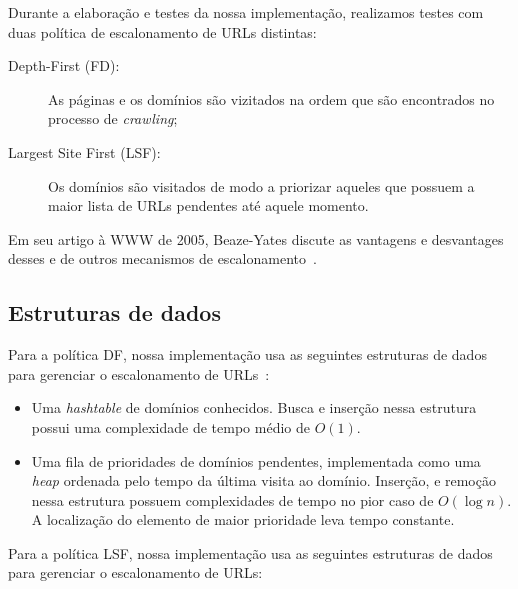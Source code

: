 \documentclass[10pt,twocolumn]{article}
\begin{document}
Durante a elaboração e testes da nossa implementação, realizamos testes
com duas política de escalonamento de URLs distintas:
\begin{description}
\item[Depth-First (FD):] As páginas e os domínios são vizitados na ordem que
são encontrados no processo de \emph{crawling};
\item[Largest Site First (LSF):] Os domínios são visitados de modo a priorizar
aqueles que possuem a maior lista de URLs pendentes até aquele momento.
\end{description}

Em seu artigo à WWW de 2005, Beaze-Yates discute as vantagens e
desvantages desses e de outros mecanismos de
escalonamento~\cite{baezayates2005crawling}.



\subsection{Estruturas de dados}

Para a política DF, nossa implementação usa as seguintes estruturas de
dados para gerenciar o escalonamento de URLs~\cite{cormen-algorithms}:

\begin{itemize}
\item Uma \emph{hashtable} de domínios conhecidos. Busca e inserção
nessa estrutura possui uma complexidade de tempo médio de \(O\left(1 
\right)\).
\item Uma fila de prioridades de domínios pendentes, implementada como
uma \emph{heap} ordenada pelo tempo da última visita ao domínio.
Inserção, e remoção nessa estrutura possuem
complexidades de tempo no pior caso de \(O\left(\log n\right)\). A
localização do elemento de maior prioridade leva tempo constante.
\end{itemize}

Para a política LSF, nossa implementação usa as seguintes estruturas de
dados para gerenciar o escalonamento de URLs:
\end{document}
